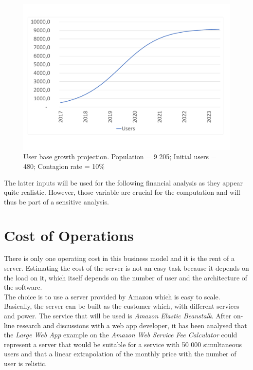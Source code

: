 \documentclass[12pt,a4paper,oneside]{book}
\begin{document}
\begin{figure}[h]
\centering
\caption{User base growth projection. Population = 9 205; Initial users = 480; Contagion rate = 10\%}
\label{ugp}
\includegraphics[keepaspectratio=true,width=\textwidth-2cm]{../graph/usergrowth.pdf}
\end{figure}

The latter inputs will be used for the following financial analysis as they appear quite realistic. However, those variable are crucial for the computation and will thus be part of a sensitive analysis.


\section{Cost of Operations}
There is only one operating cost in this business model and it is the rent of a server. Estimating the cost of the server is not an easy task because it depends on the load on it, which itself depends on the number of user and the architecture of the software.\\

The choice is to use a server provided by Amazon which is easy to scale. Basically, the server can be built as the customer which, with different services and power. The service that will be used is \textit{Amazon Elastic Beanstalk}. After on-line research and discussions with a web app developer, it has been analysed that the \textit{Large Web App} example on the \textit{Amazon Web Service Fee Calculator} could represent a server that would be suitable for a service with 50 000 simultaneous users and that a linear extrapolation of the monthly price with the number of user is relistic.\cite{itwlois}\cite{qaws}\cite{hsaws}\\
\end{document}
